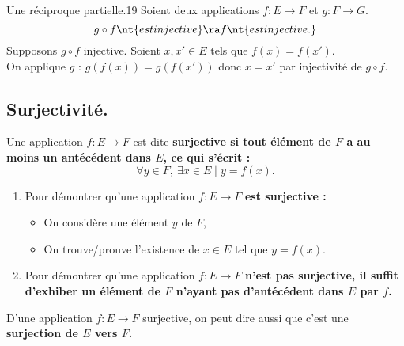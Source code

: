 \documentclass[11pt]{article}
\begin{document}
\begin{prop}{Une réciproque partielle.}{19}
    Soient deux applications $f:E\to F$ et $g:F\to G$.
    \begin{equation*}
        g \circ f \nt{ est injective} \ra f \nt{ est injective.}
    \end{equation*}
    \tcblower
    Supposons $g\circ f$ injective. Soient $x,x'\in E$ tels que $f(x)=f(x')$.\\
    On applique $g$ : $g(f(x))=g(f(x'))$ donc $x=x'$ par injectivité de $g\circ f$.
\end{prop}

\subsection{Surjectivité.}

\begin{defi}{}{}
    Une application $f:E\to F$ est dite \bf{surjective} si tout élément de $F$ a au moins un antécédent dans $E$, ce qui s'écrit :
    \begin{equation*}
        \forall y \in F, ~ \exists x \in E \mid y = f(x).
    \end{equation*}
\end{defi}

\begin{meth}{}{}
    \begin{enumerate}
        \item Pour démontrer qu'une application $f:E\to F$ \bf{est} surjective :
        \begin{itemize}
            \item On considère une élément $y$ de $F$,
            \item On trouve/prouve l'existence de $x\in E$ tel que $y=f(x)$.
        \end{itemize}
        \item Pour démontrer qu'une application $f:E\to F$ \bf{n'est pas} surjective, il suffit d'exhiber un élément de $F$ n'ayant pas d'antécédent dans $E$ par $f$.
    \end{enumerate}
\end{meth}

D'une application $f:E\to F$ surjective, on peut dire aussi que c'est une \bf{surjection} de $E$ vers $F$.
\end{document}
